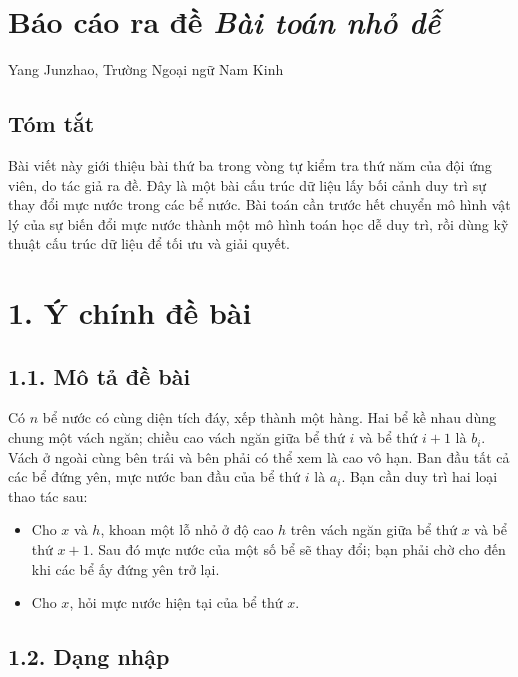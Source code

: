 \documentclass[11pt]{article}
\begin{document}
\clearpage
\section*{Báo cáo ra đề \emph{Bài toán nhỏ dễ}}

\begin{center}
Yang Junzhao, Trường Ngoại ngữ Nam Kinh
\end{center}

\subsection*{Tóm tắt}

Bài viết này giới thiệu bài thứ ba trong vòng tự kiểm tra thứ năm của đội
ứng viên, do tác giả ra đề. Đây là một bài cấu trúc dữ liệu lấy bối cảnh duy
trì sự thay đổi mực nước trong các bể nước. Bài toán cần trước hết chuyển mô
hình vật lý của sự biến đổi mực nước thành một mô hình toán học dễ duy trì,
rồi dùng kỹ thuật cấu trúc dữ liệu để tối ưu và giải quyết.

\section*{1. Ý chính đề bài}

\subsection*{1.1. Mô tả đề bài}

Có \(n\) bể nước có cùng diện tích đáy, xếp thành một hàng. Hai bể kề nhau
dùng chung một vách ngăn; chiều cao vách ngăn giữa bể thứ \(i\) và bể thứ
\(i+1\) là \(b_i\). Vách ở ngoài cùng bên trái và bên phải có thể xem là cao
vô hạn. Ban đầu tất cả các bể đứng yên, mực nước ban đầu của bể thứ \(i\) là
\(a_i\). Bạn cần duy trì hai loại thao tác sau:

\begin{itemize}
  \item Cho \(x\) và \(h\), khoan một lỗ nhỏ ở độ cao \(h\) trên vách ngăn
        giữa bể thứ \(x\) và bể thứ \(x+1\). Sau đó mực nước của một số bể
        sẽ thay đổi; bạn phải chờ cho đến khi các bể ấy đứng yên trở lại.
  \item Cho \(x\), hỏi mực nước hiện tại của bể thứ \(x\).
\end{itemize}

\subsection*{1.2. Dạng nhập}
\end{document}
